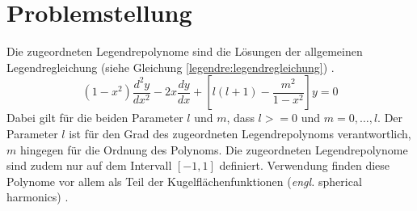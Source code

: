 %
%
%
\section{Problemstellung
\label{legendre:section:problemstellung}}
Die zugeordneten Legendrepolynome sind die Lösungen der allgemeinen Legendregleichung (siehe Gleichung \eqref{legendre:legendregleichung}) \cite{legendre:assoc-legendre-poly-wolfram} \cite{legendre:assoc-legendre-diff-wolfram}.
\begin{equation}
(1-x^2) \frac{d^2y}{dx^2}
-2x \frac{dy}{dx}
+ \left[ l(l+1)- \frac{m^2}{1-x^2} \right] y
=0
\label{legendre:legendregleichung}
\end{equation}
Dabei gilt für die beiden Parameter $l$ und $m$, dass $l>=0$ und $m=0, \ldots , l$.
Der Parameter $l$ ist für den Grad des zugeordneten Legendrepolynoms verantwortlich, $m$ hingegen für die Ordnung des Polynoms.
Die zugeordneten Legendrepolynome sind zudem nur auf dem Intervall $[-1, 1]$ definiert.
Verwendung finden diese Polynome vor allem als Teil der Kugelflächenfunktionen (\textit{engl.} spherical harmonics) \cite{legendre:spherical-harmonic-wolfram}.

